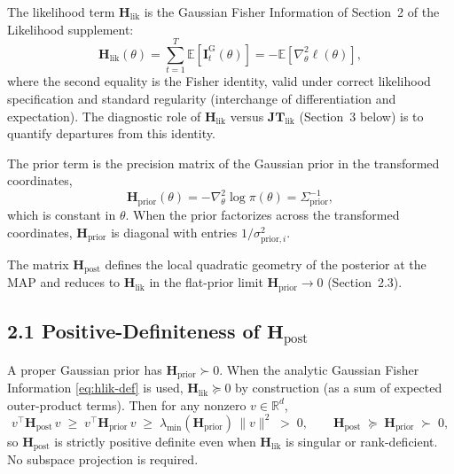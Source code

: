 \documentclass[11pt]{article}
\begin{document}
The likelihood term $\mathbf H_{\mathrm{lik}}$ is the Gaussian Fisher Information of Section~2 of the Likelihood supplement:
\begin{equation}
\mathbf H_{\mathrm{lik}}(\theta)
=
\sum_{t=1}^T \mathbb{E}\!\left[\mathbf I_t^{\mathrm{G}}(\theta)\right]
=
- \mathbb{E}\!\left[\nabla_\theta^2 \ell(\theta)\right],
\label{eq:hlik-def}
\end{equation}
where the second equality is the Fisher identity, valid under correct likelihood specification and standard regularity (interchange of differentiation and expectation). The diagnostic role of $\mathbf H_{\mathrm{lik}}$ versus $\mathbf{JT}_{\mathrm{lik}}$ (Section~3 below) is to quantify departures from this identity.

The prior term is the precision matrix of the Gaussian prior in the transformed coordinates,
\begin{equation}
\mathbf H_{\mathrm{prior}}(\theta)
=
- \nabla_\theta^2 \log \pi(\theta)
= \Sigma_{\mathrm{prior}}^{-1},
\label{eq:hprior-def}
\end{equation}
which is constant in $\theta$. When the prior factorizes across the transformed coordinates, $\mathbf H_{\mathrm{prior}}$ is diagonal with entries $1/\sigma_{\mathrm{prior},i}^2$.

The matrix $\mathbf H_{\mathrm{post}}$ defines the local quadratic geometry of the posterior at the MAP and reduces to $\mathbf H_{\mathrm{lik}}$ in the flat-prior limit $\mathbf H_{\mathrm{prior}} \to 0$ (Section~2.3).

\subsection*{2.1 Positive-Definiteness of $\mathbf H_{\mathrm{post}}$}

A proper Gaussian prior has $\mathbf H_{\mathrm{prior}} \succ 0$. When the analytic Gaussian Fisher Information \eqref{eq:hlik-def} is used, $\mathbf H_{\mathrm{lik}} \succeq 0$ by construction (as a sum of expected outer-product terms). Then for any nonzero $v \in \mathbb{R}^d$,
\begin{equation}
v^\top \mathbf H_{\mathrm{post}}\, v
\;\geq\;
v^\top \mathbf H_{\mathrm{prior}}\, v
\;\geq\;
\lambda_{\min}(\mathbf H_{\mathrm{prior}})\,\|v\|^2
\;>\;0,
\qquad
\mathbf H_{\mathrm{post}}
\;\succeq\;
\mathbf H_{\mathrm{prior}}
\;\succ\; 0,
\label{eq:posterior-hessian-pd}
\end{equation}
so $\mathbf H_{\mathrm{post}}$ is strictly positive definite even when $\mathbf H_{\mathrm{lik}}$ is singular or rank-deficient. No subspace projection is required.
\end{document}
